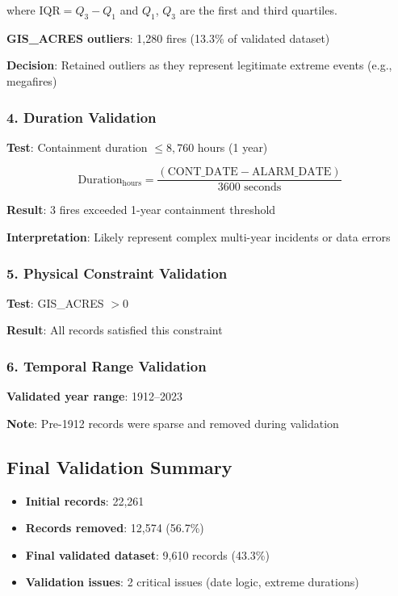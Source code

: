 \documentclass[12pt,a4paper]{article}
\begin{document}
where $\text{IQR} = Q_3 - Q_1$ and $Q_1$, $Q_3$ are the first and third quartiles.

\textbf{GIS\_ACRES outliers}: 1{,}280 fires (13.3\% of validated dataset)

\textbf{Decision}: Retained outliers as they represent legitimate extreme events (e.g., megafires)

\subsubsection{4. Duration Validation}

\textbf{Test}: Containment duration $\leq 8{,}760$ hours (1 year)

\begin{equation}
\text{Duration}_{\text{hours}} = \frac{(\text{CONT\_DATE} - \text{ALARM\_DATE})}{\text{3600 seconds}}
\end{equation}

\textbf{Result}: 3 fires exceeded 1-year containment threshold

\textbf{Interpretation}: Likely represent complex multi-year incidents or data errors

\subsubsection{5. Physical Constraint Validation}

\textbf{Test}: GIS\_ACRES $> 0$

\textbf{Result}: All records satisfied this constraint

\subsubsection{6. Temporal Range Validation}

\textbf{Validated year range}: 1912--2023

\textbf{Note}: Pre-1912 records were sparse and removed during validation

\subsection{Final Validation Summary}

\begin{itemize}
    \item \textbf{Initial records}: 22{,}261
    \item \textbf{Records removed}: 12{,}574 (56.7\%)
    \item \textbf{Final validated dataset}: 9{,}610 records (43.3\%)
    \item \textbf{Validation issues}: 2 critical issues (date logic, extreme durations)
\end{itemize}
\end{document}
